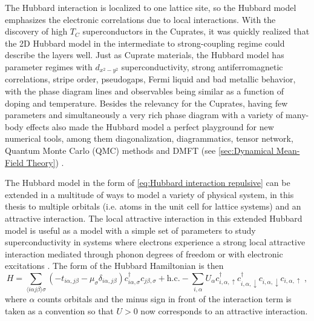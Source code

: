 \documentclass[../notes.tex]{subfiles}
\begin{document}
The Hubbard interaction is localized to one lattice site, so the Hubbard model emphasizes the electronic correlations due to local interactions.
With the discovery of high \(T_C\) superconductors in the Cuprates, it was quickly realized that the 2D Hubbard model in the intermediate to strong-coupling regime could describe the  layers \cite{zhangEffectiveHamiltonianSuperconducting1988} well.
Just as Cuprate materials, the Hubbard model has parameter regimes with \(d_{x^2 - y^2}\) superconductivity, strong antiferromagnetic correlations, stripe order, pseudogaps, Fermi liquid and bad metallic behavior, with the phase diagram lines and observables being similar as a function of doping and temperature.
Besides the relevancy for the Cuprates, having few parameters and simultaneously a very rich phase diagram with a variety of many-body effects also made the Hubbard model a perfect playground for new numerical tools, among them diagonalization, diagrammatics, tensor network, Quantum Monte Carlo (QMC) methods and DMFT (see \cref{sec:Dynamical Mean-Field Theory}) \cite{qinHubbardModelComputational2022}.

The Hubbard model  in the form of \cref{eq:Hubbard interaction repulsive} can be extended in a multitude of ways to model a variety of physical system, in this  thesis to multiple orbitals (i.e. atoms in the unit cell for lattice systems) and an attractive interaction.
The local attractive interaction in this extended Hubbard model is useful as a model with a simple set of parameters to study superconductivity in systems where electrons experience a strong local attractive interaction mediated through phonon degrees of freedom or with electronic excitations \cite{micnasSuperconductivityNarrowbandSystems1990}.
The form of the Hubbard Hamiltonian is then
\begin{equation}
	H = \sum_{\langle i \alpha j \beta \rangle \sigma} \left(-t_{i \alpha, j \beta} - \mu_{\sigma} \delta_{i \alpha, j \beta}\right) c_{i \alpha, \sigma}^{\dagger} c_{j \beta, \sigma} + \mathrm{h.c.} -\sum_{i, \alpha} U_{\alpha} c_{i, \alpha, \uparrow}^{\dagger} c_{i, \alpha, \downarrow}^{\dagger} c_{i, \alpha, \downarrow} c_{i, \alpha, \uparrow} \;,
	\label{eq:Hubbard interaction multiband}
\end{equation}
where \(\alpha\) counts orbitals and the minus sign in front of the interaction term is taken as a convention so that \(U > 0\) now corresponds to an attractive interaction.
\end{document}
